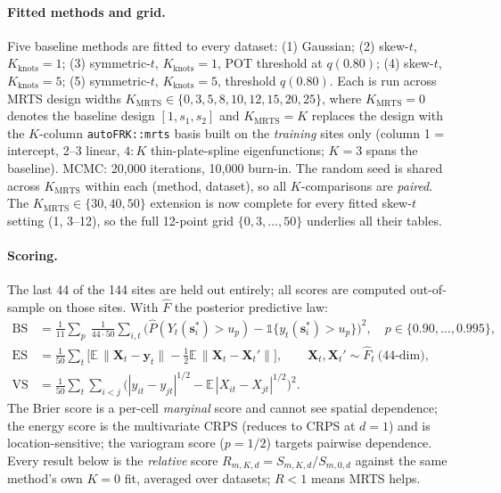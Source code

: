 \documentclass[11pt]{article}
\newcommand{\bs}{\boldsymbol{s}}
\newcommand{\E}{\mathbb{E}}
\newcommand{\one}{\mathbb{1}}
\newcommand{\Kmrts}{K_{\mathrm{MRTS}}}
\begin{document}
\paragraph{Fitted methods and grid.}
Five baseline methods are fitted to every dataset:
(1) Gaussian; (2) skew-$t$, $K_{\text{knots}}=1$; (3) symmetric-$t$,
$K_{\text{knots}}=1$, POT threshold at $q(0.80)$; (4) skew-$t$,
$K_{\text{knots}}=5$; (5) symmetric-$t$, $K_{\text{knots}}=5$, threshold
$q(0.80)$. Each is run across MRTS design widths
$\Kmrts \in \{0, 3, 5, 8, 10, 12, 15, 20, 25\}$, where $\Kmrts = 0$ denotes
the baseline design $[1, s_1, s_2]$ and $\Kmrts = K$ replaces the design with
the $K$-column \texttt{autoFRK::mrts} basis built on the \emph{training} sites
only (column 1 = intercept, 2--3 linear, $4{:}K$ thin-plate-spline
eigenfunctions; $K=3$ spans the baseline). MCMC: 20{,}000 iterations, 10{,}000
burn-in. The random seed is shared across $\Kmrts$ within each
(method, dataset), so all $K$-comparisons are \emph{paired}. The
$\Kmrts \in \{30, 40, 50\}$ extension is now complete for every fitted
skew-$t$ setting (1, 3--12), so the full 12-point grid
$\{0, 3, \dots, 50\}$ underlies all their tables.

\paragraph{Scoring.}
The last 44 of the 144 sites are held out entirely; all scores are computed
out-of-sample on those sites. With $\hat F$ the posterior predictive law:
\begin{align}
\mathrm{BS} &= \tfrac{1}{11}\sum_{p}\ \tfrac{1}{44\cdot 50}\sum_{i,t}
\big(\hat P(Y_t(\bs_i^*) > u_p) - \one\{y_t(\bs_i^*) > u_p\}\big)^2,
\quad p \in \{0.90, \dots, 0.995\},\\
\mathrm{ES} &= \tfrac{1}{50}\sum_t \Big[\E\,\lVert \boldsymbol X_t - \boldsymbol y_t\rVert
- \tfrac12 \E\,\lVert \boldsymbol X_t - \boldsymbol X_t'\rVert\Big],
\qquad \boldsymbol X_t, \boldsymbol X_t' \sim \hat F_t \ \text{(44-dim)},\\
\mathrm{VS} &= \tfrac{1}{50}\sum_t \sum_{i<j}
\big(|y_{it}-y_{jt}|^{1/2} - \E\,|X_{it}-X_{jt}|^{1/2}\big)^2 .
\end{align}
The Brier score is a per-cell \emph{marginal} score and cannot see spatial
dependence; the energy score is the multivariate CRPS (reduces to CRPS at
$d=1$) and is location-sensitive; the variogram score ($p=1/2$) targets
pairwise dependence. Every result below is the \emph{relative} score
$R_{m,K,d} = S_{m,K,d} / S_{m,0,d}$ against the same method's own $K=0$ fit,
averaged over datasets; $R<1$ means MRTS helps.
\end{document}
